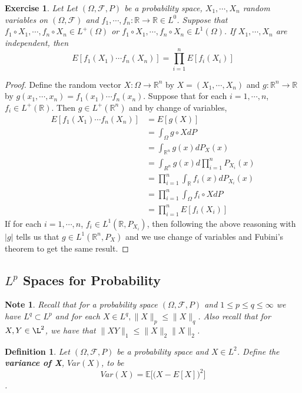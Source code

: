 \documentclass[12pt]{amsart}
\newtheorem{defn}[thm]{Definition}
\newtheorem{note}[thm]{Note}
\newtheorem{ex}[thm]{Exercise}
\newcommand{\Om}{\Omega}
\newcommand{\E}{\mathbb{E}}
\newcommand{\R}{\mathbb{R}}
\newcommand{\MF}{\mathcal{F}}
\begin{document}
	\begin{ex}
		Let Let $(\Om, \MF, P)$ be a probability space, $X_1, \cdots, X_n$ random variables on $(\Om, \MF)$ and $f_1, \cdots, f_n: \R \rightarrow \R \in L^0$. Suppose that $f_1 \circ X_1, \cdots, f_n \circ X_n\in L^+(\Om)$ or $f_1 \circ X_1, \cdots, f_n \circ X_n \in L^1(\Om)$. If $X_1, \cdots, X_n$ are independent, then $$E[f_1(X_1) \cdots f_n(X_n)] = \prod_{i=1}^n E[f_i(X_i)]$$
	\end{ex}
	
	\begin{proof}
		Define the random vector $X : \Om \rightarrow \R^n$ by $X = (X_1, \cdots, X_n)$ and $g:\R^n \rightarrow \R$ by $g(x_1, \cdots, x_n) = f_1(x_1) \cdots f_n(x_n)$. Suppose that for each $i = 1, \cdots, n$, $f_i \in L^+(\R)$. Then $g \in L^+(\R^n)$ and by change of variables,  
		\begin{align*}
			E[f_1(X_1) \cdots f_n(X_n)] 
			&= E[g(X)] \\
			&= \int_{\Om} g \circ X dP \\
			&= \int_{\R^n} g(x) dP_X(x) \\
			&= \int_{R^n} g(x) d \prod\limits_{i=1}^nP_{X_i}(x) \\
			&=  \prod_{i=1}^n \int_{\R}f_i(x) d P_{X_i}(x) \\ 
			&= \prod_{i=1}^n \int_{\Om}f_i \circ X d P \\
			&= \prod_{i=1}^n E[f_i(X_i)]
		\end{align*}
		If for each $i = 1, \cdots, n$, $f_i \in L^1(\R, P_{X_i})$, then following the above reasoning with $\vert g \vert $ tells us that $g \in L^1(\R^n, P_X)$ and we use change of variables and Fubini's theorem to get the same result.  
	\end{proof}
	
	\subsection{$L^p$ Spaces for Probability}
	
	\begin{note}
		Recall that for a probability space $(\Om, \MF, P)$ and $1 \leq p \leq q \leq \infty$ we have $L^q \subset L^p$ and for each $X \in L^q, \|X \|_p \leq  \|X\|_q$. Also recall that for $X,Y \in \L^2$, we have that $\|XY \|_1 \leq \|X\|_2 \|X\|_2$.
	\end{note}
	
	\begin{defn}
		Let $(\Om, \MF, P)$ be a probability space and $X \in L^2$. Define the \textbf{variance of X}, $Var(X)$, to be $$Var(X) = \E\big[\big(X-E[X]\big)^2\big]$$.
	\end{defn}
	
\end{document}

